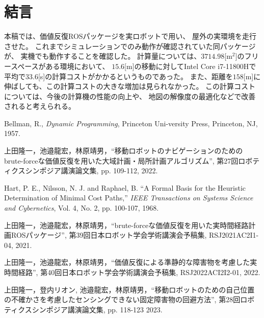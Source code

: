 \documentclass{jarticle}
\begin{document}
\section{結言}%

本稿では、価値反復ROSパッケージを実ロボットで用い、
屋外の実環境を走行させた。
これまでシミュレーションでのみ動作が確認されていた同パッケージが、
実機でも動作することを確認した。
計算量については、$3714.98$[m$^2$]のフリースペースがある環境において、
$15.6$[m]の移動に対してIntel Core i7-11800Hで
平均で$33.6$[s]の計算コストがかかるというものであった。
また、距離を$158$[m]に伸ばしても、この計算コストの大きな増加は見られなかった。
この計算コストについては、今後の計算機の性能の向上や、
地図の解像度の最適化などで改善されると考えられる。

\footnotesize
\begin{thebibliography}{99}

	Bellman, R., {\it Dynamic Programming}, Princeton Uni-versity Press, Princeton, NJ, 1957.

	上田隆一，池邉龍宏，林原靖男，``移動ロボットのナビゲーションのためのbrute-forceな価値反復を用いた大域計画・局所計画アルゴリズム'', 
	第27回ロボティクスシンポジア講演論文集, pp. 109-112, 2022.
	
	Hart, P. E., Nilsson, N. J. and Raphael, B. ``A Formal
	Basis for the Heuristic Determination of Minimal Cost
	Paths,'' {\it IEEE Transactions on Systems Science and Cybernetics}, Vol. 4, No. 2, pp. 100-107, 1968.
	
	上田隆一，池邉龍宏，林原靖男，``brute-forceな価値反復を用いた実時間経路計画ROSパッケージ'', 
	第39回日本ロボット学会学術講演会予稿集, RSJ2021AC2I1-04, 2021.

	上田隆一，池邉龍宏，林原靖男，``価値反復による準静的な障害物を考慮した実時間経路'', 
	第40回日本ロボット学会学術講演会予稿集, RSJ2022ACI2I2-01, 2022.

	上田隆一，登内リオン, 池邉龍宏，林原靖男，``移動ロボットのための自己位置の不確かさを考慮したセンシングできない固定障害物の回避方法'', 
	第28回ロボティクスシンポジア講演論文集, pp. 118-123 2023.

\end{thebibliography}

\normalsize
\end{document}
